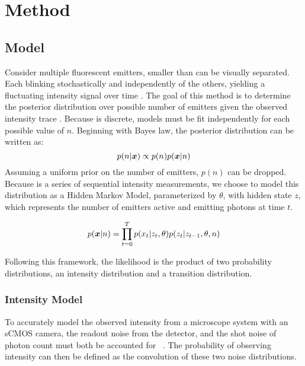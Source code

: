 \section{Method}

\subsection{Model}
Consider multiple fluorescent emitters, smaller than can be visually separated.
  Each blinking stochastically and independently of the others, 
  yielding a fluctuating intensity signal over time .
  The goal of this method is to determine the posterior distribution over 
  possible number of emitters \ndist given the observed intensity trace \trace.
  Because \ndist is discrete, models must be fit independently for each possible value of $n$.
  Beginning with Bayes law, the posterior distribution can be written as:
  \begin{equation*}
    p(n | \bm{x}) \propto p(n) p(\bm{x} | n)
  \end{equation*}
  Assuming a uniform prior on the number of emitters, $p(n)$ can be dropped.
  Because \trace is a series of sequential intensity measurements, 
    we choose to model this distribution as a Hidden Markov Model, parameterized by $\theta$,
     with hidden state $z$, which represents the number of emitters active and emitting photons at time $t$.
    
  \begin{equation}
    p(\bm{x}| n) = \prod_{t=0}^{T} p(x_{t} | z_{t}, \theta) p(z_{t} | z_{t-1}, \theta, n)
    \label{eq:method:HMM}
  \end{equation}

  Following this framework, the likelihood is the product of two probability distributions,
  an intensity distribution and a transition distribution. 

\subsubsection{Intensity Model}

To accurately model the observed intensity from a microscope system with an sCMOS camera, 
  the readout noise from the detector, and the shot noise of photon count must both be accounted for~\cite{huang_video-rate_2013} .
  The probability of observing intensity \x{} can then be defined as the convolution of these two noise distributions.

